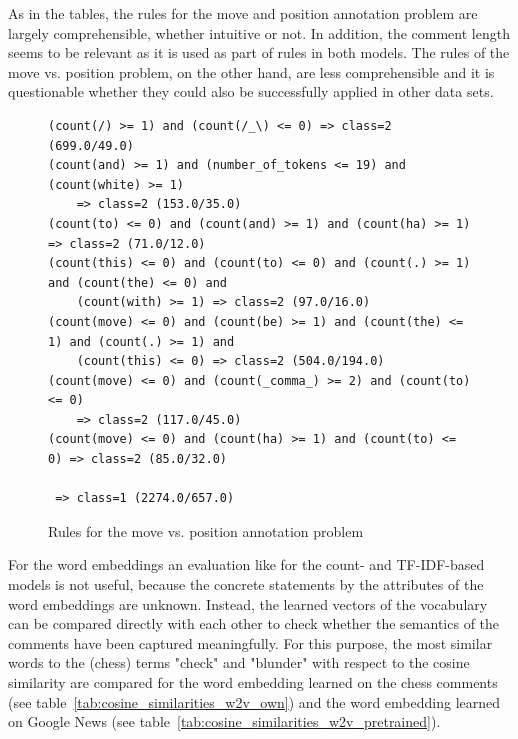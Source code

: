 \documentclass[article,type=msc,colorback,accentcolor=tud7b]{tudthesis}
\begin{document}
    As in the tables, the rules for the move and position annotation problem are largely comprehensible, whether intuitive or not. In addition, the comment length seems to be relevant as it is used as part of rules in both models. The rules of the move vs. position problem, on the other hand, are less comprehensible and it is questionable whether they could also be successfully applied in other data sets.
    	
	\begin{figure}[H]
	  \centering
	  \begin{lstlisting}	  
(count(/) >= 1) and (count(/_\) <= 0) => class=2 (699.0/49.0)
(count(and) >= 1) and (number_of_tokens <= 19) and (count(white) >= 1) 
	=> class=2 (153.0/35.0)
(count(to) <= 0) and (count(and) >= 1) and (count(ha) >= 1) => class=2 (71.0/12.0)
(count(this) <= 0) and (count(to) <= 0) and (count(.) >= 1) and (count(the) <= 0) and 
	(count(with) >= 1) => class=2 (97.0/16.0)
(count(move) <= 0) and (count(be) >= 1) and (count(the) <= 1) and (count(.) >= 1) and 
	(count(this) <= 0) => class=2 (504.0/194.0)
(count(move) <= 0) and (count(_comma_) >= 2) and (count(to) <= 0) 
	=> class=2 (117.0/45.0)
(count(move) <= 0) and (count(ha) >= 1) and (count(to) <= 0) => class=2 (85.0/32.0)

 => class=1 (2274.0/657.0)
	  \end{lstlisting}
      \caption{Rules for the move vs. position annotation problem}
      \label{fig:move_vs_position_rules}
	\end{figure}
	
    For the word embeddings an evaluation like for the count- and TF-IDF-based models is not useful, because the concrete statements by the attributes of the word embeddings are unknown. Instead, the learned vectors of the vocabulary can be compared directly with each other to check whether the semantics of the comments have been captured meaningfully. For this purpose, the most similar words to the (chess) terms "check" and "blunder" with respect to the cosine similarity are compared for the word embedding learned on the chess comments (see table~\ref{tab:cosine_similarities_w2v_own}) and the word embedding learned on Google News (see table~\ref{tab:cosine_similarities_w2v_pretrained}).
\end{document}
